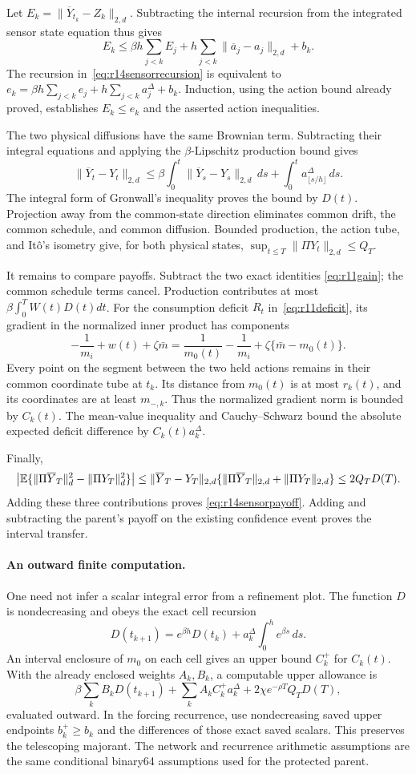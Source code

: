 Let $E_k=\|\overline Y_{t_k}-Z_k\|_{2,d}$. Subtracting the internal
recursion from the integrated sensor state equation thus gives
\[
 E_k\leq\beta h\sum_{j<k}E_j
       +h\sum_{j<k}\|\overline a_j-a_j\|_{2,d}+b_k.
\]
The recursion in~\eqref{eq:r14sensorrecursion} is equivalent to
$e_k=\beta h\sum_{j<k}e_j+h\sum_{j<k}a_j^\Delta+b_k$.
Induction, using the action bound already proved, establishes
$E_k\leq e_k$ and the asserted action inequalities.

The two physical diffusions have the same Brownian term. Subtracting
their integral equations and applying the $\beta$-Lipschitz production
bound gives
\[
 \|\overline Y_t-Y_t\|_{2,d}
 \leq\beta\int_0^t\|\overline Y_s-Y_s\|_{2,d}\,ds
       +\int_0^t a_{\lfloor s/h\rfloor}^\Delta\,ds.
\]
The integral form of Gronwall's inequality proves the bound by $D(t)$.
Projection away from the common-state direction eliminates common
drift, the common schedule, and common diffusion. Bounded production,
the action tube, and It\^o's isometry give, for both physical states,
$\sup_{t\leq T}\|\Pi Y_t\|_{2,d}\leq Q_T$.

It remains to compare payoffs. Subtract the two exact identities
\eqref{eq:r11gain}; the common schedule terms cancel. Production
contributes at most $\beta\int_0^TW(t)D(t)dt$.
For the consumption deficit $R_t$ in~\eqref{eq:r11deficit}, its gradient
in the normalized inner product has components
\[
 -\frac1{m_i}+w(t)+\zeta\bar m
  =\frac1{m_0(t)}-\frac1{m_i}
       +\zeta\{\bar m-m_0(t)\}.
\]
Every point on the segment between the two held actions remains in
their common coordinate tube at $t_k$. Its distance from $m_0(t)$ is
at most $r_k(t)$, and its coordinates are at least $m_{-,k}$. Thus the
normalized gradient norm is bounded by $C_k(t)$. The mean-value
inequality and Cauchy--Schwarz bound the absolute expected deficit
difference by $C_k(t)a_k^\Delta$.

Finally,
\[
 \left|\mathbb E\{\|\Pi\overline Y_T\|_d^2-\|\Pi Y_T\|_d^2\}\right|
 \leq\|\overline Y_T-Y_T\|_{2,d}
       \{\|\Pi\overline Y_T\|_{2,d}+\|\Pi Y_T\|_{2,d}\}
 \leq2Q_TD(T).
\]
Adding these three contributions proves
\eqref{eq:r14sensorpayoff}. Adding and subtracting the parent's payoff
on the existing confidence event proves the interval transfer.

\paragraph*{An outward finite computation.}
One need not infer a scalar integral error from a refinement plot.
The function $D$ is nondecreasing and obeys the exact cell recursion
\[
 D(t_{k+1})=e^{\beta h}D(t_k)
                +a_k^\Delta\int_0^h e^{\beta s}\,ds.
\]
An interval enclosure of $m_0$ on each cell gives an upper bound
$C_k^+$ for $C_k(t)$. With the already enclosed weights $A_k,B_k$,
a computable upper allowance is
\[
 \beta\sum_k B_kD(t_{k+1})
       +\sum_k A_kC_k^+a_k^\Delta
       +2\chi e^{-\rho T}Q_TD(T),
\]
evaluated outward. In the forcing recurrence, use nondecreasing saved
upper endpoints $b_k^+\geq b_k$ and the differences of those exact
saved scalars. This preserves the telescoping majorant. The network
and recurrence arithmetic assumptions are the same conditional
binary64 assumptions used for the protected parent.
